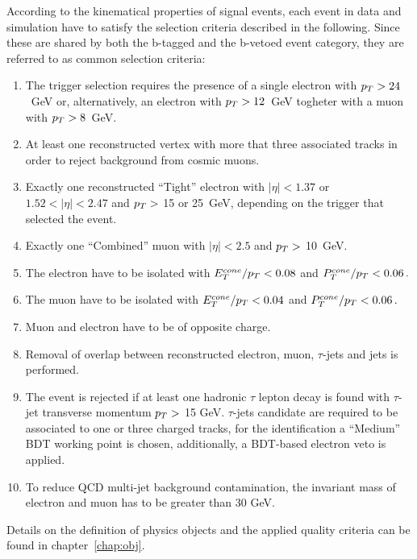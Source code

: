 According to the kinematical properties of signal events, each event in data and simulation have to satisfy
the selection criteria described in the following. Since these are shared by both the b-tagged and the b-vetoed event category,
they are referred to as common selection criteria:


\begin{enumerate}[label=(\roman*)]
\item The trigger selection requires the presence of a single electron with $p_{T} > 24$~GeV or, alternatively,
	an electron with  $p_{T} > 12$~GeV togheter with a muon with  $p_{T} > 8$~GeV. 

\item At least one reconstructed vertex with more that three associated tracks in order to 
	reject background from cosmic muons.

\item Exactly one reconstructed ``Tight'' electron with $|\eta| < 1.37 $ or $1.52 < |\eta| < 2.47$ and
	 $p_{T} > $ 15 or 25~GeV, depending on the trigger that selected the event. 

\item Exactly one ``Combined'' muon with $|\eta| < 2.5$ and  $p_{T} > $ 10~GeV.

\item The electron have to be isolated with $E_T^{cone}/ p_{T} < 0.08$ and $P_T^{cone}/ p_{T} < 0.06\,.$ 

\item The muon have to be isolated with  $E_T^{cone}/ p_{T} < 0.04$ and $P_T^{cone}/ p_{T} <  0.06\,.$ 

\item Muon and electron have to be of opposite charge.

\item Removal of overlap between reconstructed electron, muon, $\tau$-jets and jets is performed.

\item The event is rejected if at least one hadronic $\tau$ lepton decay is found with  $\tau$-jet transverse 
	momentum  $p_{T} > $ 15 GeV. $\tau$-jets candidate are required to be associated to one or three charged tracks,
	for the identification a ``Medium'' BDT working point is chosen, additionally, a BDT-based electron veto is 
	applied. 

\item To reduce QCD multi-jet background contamination, the invariant mass of electron and muon has to be 
	greater than 30 GeV.

\end{enumerate}
Details on  the definition of physics objects and the applied quality criteria  can be found in  chapter~\ref{chap:obj}.


